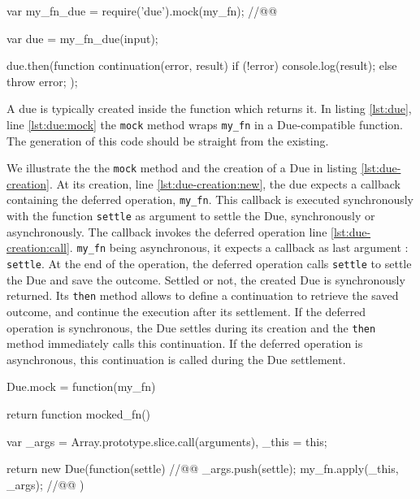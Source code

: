 \begin{code}[js, %
             caption={Example of a due}, %
             label={lst:due}] %
var my_fn_due = require('due').mock(my_fn); //@\label{lst:due:mock}@

var due = my_fn_due(input);

due.then(function continuation(error, result) {
  if (!error) {
    console.log(result);
  } else {
    throw error;
  }
});
\end{code}

A due is typically created inside the function which returns it.
In listing \ref{lst:due}, line \ref{lst:due:mock} the \texttt{mock} method wraps \texttt{my\_fn} in a Due-compatible function.
The generation of this code should be straight from the existing.

We illustrate the the \texttt{mock} method and the creation of a Due in listing \ref{lst:due-creation}.
At its creation, line \ref{lst:due-creation:new}, the due expects a callback containing the deferred operation, \texttt{my\_fn}.
This callback is executed synchronously with the function \texttt{settle} as argument to settle the Due, synchronously or asynchronously.
The callback invokes the deferred operation line \ref{lst:due-creation:call}.
\texttt{my\_fn} being asynchronous, it expects a callback as last argument : \texttt{settle}.
At the end of the operation, the deferred operation calls \texttt{settle} to settle the Due and save the outcome.
Settled or not, the created Due is synchronously returned.
Its \texttt{then} method allows to define a continuation to retrieve the saved outcome, and continue the execution after its settlement.
If the deferred operation is synchronous, the Due settles during its creation and the \texttt{then} method immediately calls this continuation.
If the deferred operation is asynchronous, this continuation is called during the Due settlement.


\begin{code}[js, %
             caption={Creation of a due}, %
             label={lst:due-creation}] %
Due.mock = function(my_fn) {
  return function mocked_fn() {
    var _args = Array.prototype.slice.call(arguments),
        _this = this;

    return new Due(function(settle) {  //@\label{lst:due-creation:new}@
      _args.push(settle);
      my_fn.apply(_this, _args); //@\label{lst:due-creation:call}@
    })
  }
}
\end{code}

